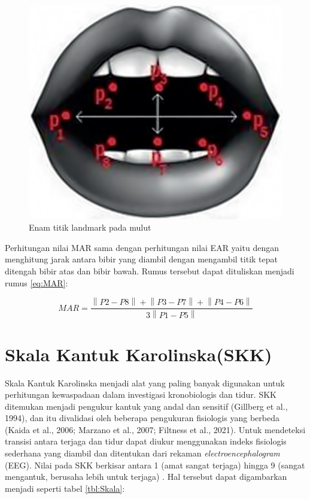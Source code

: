 \begin{figure} [ht] \centering
  \includegraphics[scale=0.4]{gambar/mulut.png}
  \caption{Enam titik landmark pada mulut \parencite{21}}
  \label{fig:mulut}
\end{figure}

Perhitungan nilai MAR sama dengan perhitungan nilai EAR yaitu dengan menghitung jarak antara bibir yang diambil dengan
mengambil titik tepat ditengah bibir atas dan bibir bawah. Rumus tersebut dapat dituliskan menjadi rumus \ref{eq:MAR}:

\begin{equation}
  \label{eq:MAR}
  MAR = \frac{\left \| P2-P8 \right \| + \left \| P3-P7 \right \| + \left \| P4-P6 \right \|}{3 \left \| P1-P5 \right \|}
\end{equation}

\section{Skala Kantuk Karolinska(SKK)}
Skala Kantuk Karolinska menjadi alat yang paling banyak digunakan untuk perhitungan kewaspadaan dalam investigasi
kronobiologis dan tidur. SKK ditemukan menjadi pengukur kantuk yang andal dan sensitif (Gillberg et al., 1994), dan
itu divalidasi oleh beberapa pengukuran fisiologis yang berbeda (Kaida et al., 2006; Marzano et al., 2007; Filtness
et al., 2021). Untuk mendeteksi transisi antara terjaga dan tidur dapat diukur menggunakan indeks fisiologis
sederhana yang diambil dan ditentukan dari rekaman \emph{electroencephalogram} (EEG). Nilai pada SKK berkisar antara 1
(amat sangat terjaga) hingga 9 (sangat mengantuk, berusaha lebih untuk terjaga) \parencite{19}. Hal tersebut dapat
digambarkan menjadi seperti tabel \ref{tbl:Skala}:

